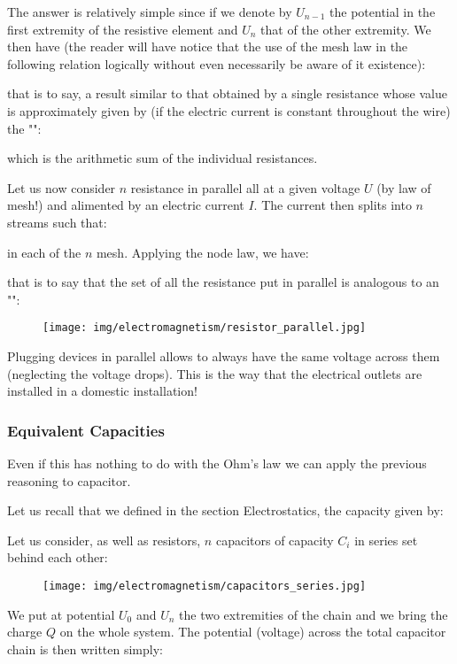 	The answer is relatively simple since if we denote by $U_{n-1}$ the potential in the first extremity of the resistive element and $U_n$ that of the other extremity. We then have (the reader will have notice that the use of the mesh law in the following relation logically without even necessarily be aware of it existence):
	
	that is to say, a result similar to that obtained by a single resistance whose value is approximately given by (if the electric current is constant throughout the wire) the "":
	
	which is the arithmetic sum of the individual resistances.

	Let us now consider $n$ resistance in parallel all at a given voltage $U$ (by law of mesh!) and alimented by an electric current $I$. The current then splits into $n$ streams such that:
	
	in each of the $n$ mesh. Applying the node law, we have:
	
	that is to say that the set of all the resistance put in parallel is analogous to an "":
	
	\begin{figure}[H]
		\centering
		\texttt{[image: img/electromagnetism/resistor\_parallel.jpg]}
	\end{figure}
	Plugging devices in parallel allows to always have the same voltage across them (neglecting the voltage drops). This is the way that the electrical outlets are installed in a domestic installation!
	
	\subsubsection{Equivalent Capacities}
	Even if this has nothing to do with the Ohm's law we can apply the previous reasoning to capacitor.
	
	Let us recall that we defined in the section Electrostatics, the capacity given by:
	
	Let us consider, as well as resistors, $n$ capacitors of capacity  $C_i$ in series set behind each other:
	\begin{figure}[H]
		\centering
		\texttt{[image: img/electromagnetism/capacitors\_series.jpg]}
	\end{figure}	
	 We put at potential $U_0$ and $U_n$ the two extremities of the chain and we bring the charge $Q$ on the whole system. The potential (voltage) across the total capacitor chain is then written simply:
	
